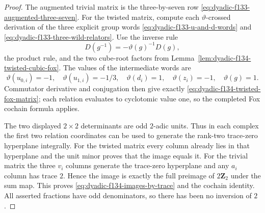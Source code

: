 \begin{proof}
The augmented
trivial matrix is the
three-by-seven row
\eqref{eq:dyadic-f133-augmented-three-seven}.
For the twisted
matrix, compute each
$\vartheta$-crossed
derivation of the three
explicit group words
\eqref{eq:dyadic-f133-u-and-d-words}
and
\eqref{eq:dyadic-f133-three-wild-relators}.
Use the inverse rule
\[
D(g^{-1})=-\vartheta(g)^{-1}D(g),
\]
the product rule,
and the two cube-root
factors from
Lemma~\ref{lem:dyadic-f134-twisted-cubic-fox}.
The values of the
intermediate words are
\[
\vartheta(u_{0,i})=-1,\quad
\vartheta(u_{1,i})=-1/3,\quad
\vartheta(d_i)=1,\quad
\vartheta(z_i)=-1,\quad
\vartheta(g)=1.
\]
Commutator derivative
and conjugation then give
exactly
\eqref{eq:dyadic-f134-twisted-fox-matrix};
each relation evaluates
to cyclotomic value one,
so the completed Fox
cochain formula applies.

The two displayed
$2\times2$ determinants
are odd $2$-adic units.
Thus in each complex
the first two relation
coordinates can be
used to generate the
rank-two trace-zero
hyperplane integrally.
For the twisted
matrix every column
already lies in that
hyperplane and the
unit minor proves
that the image equals
it.  For the trivial
matrix the three
$v_i$ columns generate
the trace-zero
hyperplane and any
$a_i$ column has trace
$2$.  Hence the image
is exactly the full
preimage of
$2\mathbf Z_2$
under the sum map.
This proves
\eqref{eq:dyadic-f134-images-by-trace}
and the cochain identity.
All asserted fractions
have odd denominators,
so there has been
no inversion of $2$.
\end{proof}

